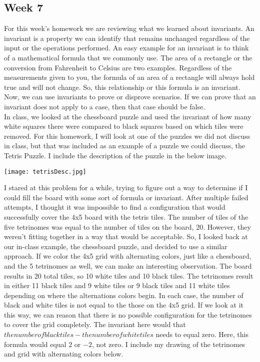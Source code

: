 \documentclass{article}
\theoremstyle{theorem}
\theoremstyle{definition}
\theoremstyle{remark}
\begin{document}
\subsection{Week 7}

\indent For this week's homework we are reviewing what we learned about invariants. An invariant is a property we can identify that remains unchanged regardless of the input or the operations performed. An easy example for an invariant is to think of a mathematical 
formula that we commonly use. The area of a rectangle or the conversion from Fahrenheit to Celsius are two examples. Regardless of the measurements given to you, the formula of an area of a rectangle will always hold true and will not change. So, this relationship
or this formula is an invariant. Now, we can use invariants to prove or disprove scenarios. If we can prove that an invariant does not apply to a case, then that case should be false. \\

In class, we looked at the chessboard puzzle and used the invariant of how many white squares there were compared to black squares based on which tiles were removed. For this homework, I will look at one of the puzzles we did not discuss in class, but 
that was included as an example of a puzzle we could discuss, the Tetris Puzzle. I include the description of the puzzle in the below image. \\

  \begin{center}
    \texttt{[image: tetrisDesc.jpg]}
  \end{center}

I stared at this problem for a while, trying to figure out a way to determine if I could fill the board with some sort of formula or invariant. After multiple failed attempts, I thought it was impossible to find a configuration that would successfully cover the 
4x5 board with the tetris tiles. The number of tiles of the five tetrinomes was equal to the number of tiles on the board, 20. However, they weren't fitting together in a way that would be acceptable. So, I looked back at our in-class example, the chessboard 
puzzle, and decided to use a similar approach. If we color the 4x5 grid with alternating colors, just like a chessboard, and the 5 tetrinomes as well, we can make an interesting observation. The board results in 20 total tiles, so 10 white tiles and 10 black tiles. 
The tetrinomes result in either 11 black tiles and 9 white tiles or 9 black tiles and 11 white tiles depending on where the alternations colors begin. In each case, the number of black and white tiles is not equal to the those on the 4x5 grid. If we look at it this way, 
we can reason that there is no possible configuration for the tetrinomes to cover the grid completely. The invariant here would that $the number of black tiles - the number of white tiles$ needs to equal zero. Here, this formula would equal $2$ or $-2$, not zero. I include 
my drawing of the tetrinomes and grid with alternating colors below. \\
\end{document}
